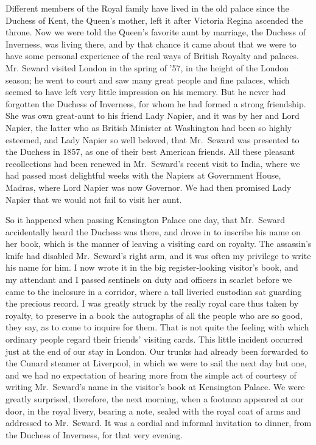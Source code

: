 \documentclass[12pt]{book}
\begin{document}
Different members of the Royal family have lived in the old palace since the
Duchess of Kent, the Queen’s mother, left it after Victoria Regina ascended the
throne. Now we were told the Queen’s favorite aunt by marriage, the Duchess of
Inverness, was living there, and by that chance it came about that we were to have
some personal experience of the real ways of British Royalty and palaces. Mr.
Seward visited London in the spring of ’57, in the height of the London season;
he went to court and saw many great people and fine palaces, which seemed to
have left very little impression on his memory. But he never had forgotten the
Duchess of Inverness, for whom he had formed a strong friendship. She was
own great‐aunt to his friend Lady Napier, and it was by her and Lord Napier, the
latter who as British Minister at Washington had been so highly esteemed, and
Lady Napier so well beloved, that Mr.~Seward was presented to the Duchess in
1857, as one of their best American friends. All these pleasant recollections had
been renewed in Mr.~Seward’s recent visit to India, where we had passed most
delightful weeks with the Napiers at Government House, Madras, where Lord
Napier was now Governor. We had then promised Lady Napier that we would
not fail to visit her aunt.

So it happened when passing Kensington Palace one day, that Mr.~Seward
accidentally heard the Duchess was there, and drove in to inscribe his name on
her book, which is the manner of leaving a visiting card on royalty. The assassin’s
knife had disabled Mr.~Seward’s right arm, and it was often my privilege to write
his name for him. I now wrote it in the big register‐looking visitor’s book, and
my attendant and I passed sentinels on duty and officers in scarlet before we
came to the inclosure in a corridor, where a tall liveried custodian sat guarding
the precious record. I was greatly struck by the really royal care thus taken by
royalty, to preserve in a book the autographs of all the people who are so good,
they say, as to come to inquire for them. That is not quite the feeling with which
ordinary people regard their friends’ visiting cards. This little incident occurred
just at the end of our stay in London. Our trunks had already been forwarded to
the Cunard steamer at Liverpool, in which we were to sail the next day but one,
and we had no expectation of hearing more from the simple act of courtesy of
writing Mr.~Seward’s name in the visitor’s book at Kensington Palace. We were
greatly surprised, therefore, the next morning, when a footman appeared at our
door, in the royal livery, bearing a note, sealed with the royal coat of arms and
addressed to Mr.~Seward. It was a cordial and informal invitation to dinner, from
the Duchess of Inverness, for that very evening.
\end{document}
